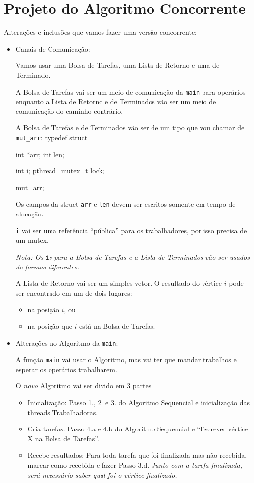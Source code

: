 \documentclass[12pt]{article}
\newenvironment{code}{\verbatim}{\endverbatim}
\newcommand{\ti}{\textit}
\begin{document}
\newpage
\section{Projeto do Algoritmo Concorrente}

Alterações e inclusões que vamos fazer uma versão concorrente:
\begin{itemize}
	\item Canais de Comunicação:

		Vamos usar uma Bolsa de Tarefas, uma Lista de Retorno
		e uma de Terminado.

		A Bolsa de Tarefas vai ser um meio de comunicação da
		\verb.main. para operários
		enquanto a Lista de Retorno e de Terminados vão
		ser um meio de comunicação do caminho contrário.

		A Bolsa de Tarefas e de Terminados
		vão ser de um tipo que vou chamar de \verb.mut_arr.:
		\begin{code}
		    typedef struct {
		        int *arr;
		        int len;

		        int i;
		        pthread_mutex_t lock;
		     } mut_arr;
		\end{code}

		Os campos da struct \verb.arr. e \verb.len.
		devem ser escritos somente em tempo de alocação.

		\verb.i. vai ser uma referência ``pública''
		para os trabalhadores, por isso precisa de um mutex.

		\ti{
			Nota: Os} \verb.i.\ti{s para a Bolsa de Tarefas e a
			Lista de Terminados vão ser usados de formas diferentes.
		}

		A Lista de Retorno vai ser um simples vetor.
		O resultado do vértice $i$ pode ser encontrado
		em um de dois lugares: 
		\begin{itemize}
			\item na posição $i$, ou
			\item na posição que $i$ está na Bolsa de Tarefas.
		\end{itemize}

	\item Alterações no Algoritmo da \verb.main.:

		A função \verb.main. vai usar o Algoritmo,
		mas vai ter que mandar trabalhos e esperar
		os operários trabalharem.

		O \ti{novo} Algoritmo vai ser divido em 3 partes:
		\begin{itemize}
			\item Inicialização:
				Passo 1., 2. e 3. do Algoritmo Sequencial
				e inicialização das threads Trabalhadoras.
			\item Cria tarefas:
				Passo 4.a e 4.b do Algoritmo Sequencial
				e ``Escrever vértice X na Bolsa de Tarefas''.
			\item Recebe resultados:
				Para toda tarefa que foi finalizada mas não recebida,
				marcar como recebida e fazer Passo 3.d.
				\ti{
					Junto com a tarefa finalizada,
					será necessário saber qual foi o vértice finalizado.
				}
		\end{itemize}


\end{itemize}
\end{document}
